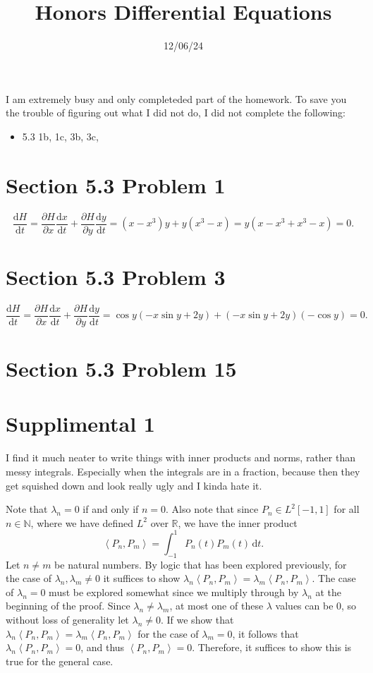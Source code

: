 \documentclass[11pt, letterpaper]{report}
\title{Honors Differential Equations}
\date{12/06/24}
\begin{document}
\makeproblem
I am extremely busy and only completeded part of the homework. To save you the trouble of figuring out what I did not do, I did not complete the following:
\begin{itemize}
	\item 5.3 1b, 1c, 3b, 3c, 
\end{itemize}
\section*{Section 5.3 Problem 1}
\[
	\frac{\mathrm{d}H}{\mathrm{d}t} =\frac{\partial H}{\partial x} \frac{\mathrm{d}x}{\mathrm{d}t} +\frac{\partial H}{\partial y} \frac{\mathrm{d}y}{\mathrm{d}t} =\left( x-x^3 \right) y+y\left( x^3-x \right) =y\left( x-x^3+x^3-x \right) =0
.\]
\section*{Section 5.3 Problem 3}
\[
	\frac{\mathrm{d}H}{\mathrm{d}t} =\frac{\partial H}{\partial x} \frac{\mathrm{d}x}{\mathrm{d}t} +\frac{\partial H}{\partial y} \frac{\mathrm{d}y}{\mathrm{d}t} =\cos y\left( -x\sin y+2y \right) +\left( -x\sin y+2y \right) \left( -\cos y \right) =0
.\]
\section*{Section 5.3 Problem 15}
\section*{Supplimental 1}
I find it much neater to write things with inner products and norms, rather than messy integrals. Especially when the integrals are in a fraction, because then they get squished down and look really ugly and I kinda hate it.

Note that $\lambda_n=0$ if and only if $n=0$. Also note that since $P_n\in L^2[-1,1]$ for all $n\in\mathbb{N}$, where we have defined $L^2$ over $\mathbb{R}$, we have the inner product
\[
	\left\langle P_n,P_m \right\rangle =\int_{-1}^{1} P_n(t)P_m(t) \,\mathrm{d} t
.\]
Let $n\neq m$ be natural numbers. By logic that has been explored previously, for the case of $\lambda_n,\lambda _m \neq 0$ it suffices to show $\lambda_n \left\langle P_n,P_m \right\rangle =\lambda_m\left\langle P_n,P_m \right\rangle $. The case of $\lambda_n=0$ must be explored somewhat since we multiply through by $\lambda_n $ at the beginning of the proof. Since $\lambda_n\neq \lambda_m$, at most one of these $\lambda $ values can be $0$, so without loss of generality let $\lambda_n\neq 0$. If we show that $\lambda_n\left\langle P_n,P_m \right\rangle =\lambda_m\left\langle P_n,P_m \right\rangle $ for the case of $\lambda_m=0$, it follows that $\lambda_n\left\langle P_n,P_m \right\rangle =0$, and thus $\left\langle P_n,P_m \right\rangle =0$. Therefore, it suffices to show this is true for the general case.
\end{document}
